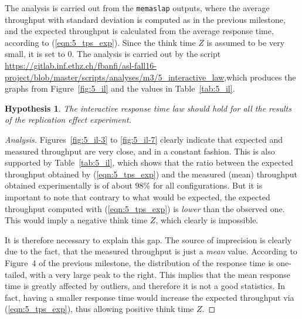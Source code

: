\documentclass[11pt]{article}
\newtheorem{hyp}{Hypothesis}
\theoremstyle{definition}
\newenvironment{ana}[1][\proofname]{\begin{proof}[Analysis]}{\end{proof}}
\renewcommand\t\texttt
\begin{document}
The analysis is carried out from the \t{memaslap} outputs, where the average throughput with standard deviation is computed as in the previous milestone, and the expected throughput is calculated from the average response time, %
according to (\ref{eqn:5_tps_exp}).
Since the think time $Z$ is assumed to be very small, it is set to $0$.
The analysis is carried out by the script \url{https://gitlab.inf.ethz.ch/fbanfi/asl-fall16-project/blob/master/scripts/analyses/m3/5_interactive_law},\break which produces the graphs from Figure~\ref{fig:5_il} and the values in Table~\ref{tab:5_il}.

\begin{hyp}
    The interactive response time law should hold for all the results of the replication effect experiment.
\end{hyp}
\begin{ana}
    Figures~\ref{fig:5_il-3} to \ref{fig:5_il-7} clearly indicate that expected and measured throughput are very close, and in a constant fashion.
    This is also supported by Table~\ref{tab:5_il}, which shows that the ratio between the expected throughput obtained by (\ref{eqn:5_tps_exp}) and the measured (mean) throughput obtained experimentally is of about $98\%$ for all configurations.
    But it is important to note that contrary to what would be expected, the expected throughput computed with (\ref{eqn:5_tps_exp}) is \emph{lower} than the observed one.
    This %
    would imply a negative think time $Z$, which clearly is impossible.
    
    It is therefore necessary to explain this gap.
    The source of imprecision is clearly due to the fact, that the measured throughput is just a \emph{mean} value.
    According to Figure~4 of the previous milestone, the distribution of the response time is one-tailed, with a very large peak to the right.
    This implies that the mean response time is greatly affected by outliers, and therefore it is not a good statistics.
    In fact, having a smaller response time would increase the expected throughput via (\ref{eqn:5_tps_exp}), thus allowing positive think time $Z$.
\end{ana}
\end{document}
